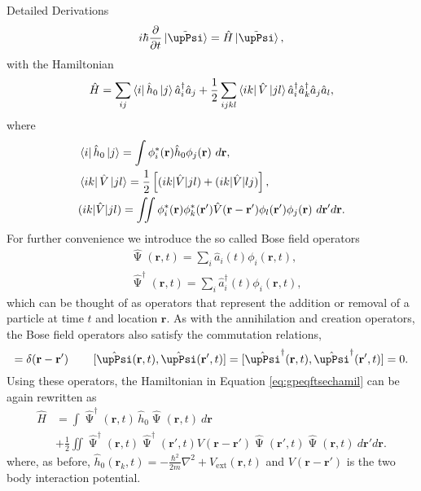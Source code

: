\begin{chapter}{Detailed Derivations\label{app:App2}}
\begin{equation*}
i \hbar\frac{\partial}{\partial t}\ket{\tilde{\upPsi}} = \hat{H}\ket{\tilde{\upPsi}},
\label{eq:gpeqftsecscho}
\end{equation*}
with the Hamiltonian
\begin{equation}
\hat{H} = \sum_{ij}\bra{i}\hat{h}_0\ket{j}\hat{a}_i^\dagger\hat{a}_j + \frac{1}{2}\sum_{ijkl} \bra{ik}\hat{V}\ket{jl}\hat{a}_i^\dagger\hat{a}_k^\dagger\hat{a}_j\hat{a}_l,
\label{eq:gpeqftsechamil}
\end{equation}
where
\begin{align*}
&\bra{i}\hat{h}_0\ket{j} = \int \phi_i^*(\mathbf{r})\hat{h}_0\phi_j(\mathbf{r})~d\mathbf{r},\\
&\bra{ik}\hat{V}\ket{jl} = \frac{1}{2}\left [ (ik|\hat{V}|jl) + (ik|\hat{V}|lj) \right ],\\
&(ik|\hat{V}|jl) = \iint \phi_i^*(\mathbf{r})\phi_k^*(\mathbf{r}')\hat{V}(\mathbf{r}-\mathbf{r}')\phi_l(\mathbf{r}')\phi_j(\mathbf{r})~d\mathbf{r}'d\mathbf{r}.
\end{align*}
For further convenience we introduce the so called Bose field operators
\begin{align*}
&\hat{\upPsi}(\mathbf{r},t) = \sum_i \hat{a}_i(t)\phi_i(\mathbf{r},t),\\
&\hat{\upPsi}^\dagger(\mathbf{r},t) = \sum_i \hat{a}^\dagger_i(t)\phi_i(\mathbf{r},t),
\end{align*}
which can be thought of as operators that represent the addition or removal of a particle at time $t$ and location $\mathbf{r}$. As with the annihilation and creation operators, the Bose field operators also satisfy the commutation relations,
\begin{equation}
[\hat{\upPsi}(\mathbf{r},t),\hat{\upPsi}^\dagger(\mathbf{r}',t)]=\delta(\mathbf{r}-\mathbf{r}')\hspace{0.3in}[\hat{\upPsi}(\mathbf{r},t),\hat{\upPsi}(\mathbf{r}',t)]=[\hat{\upPsi}^\dagger(\mathbf{r},t),\hat{\upPsi}^\dagger(\mathbf{r}',t)]=0.
\label{eq:gpeqftbfocomm}
\end{equation}
Using these operators, the Hamiltonian in Equation \ref{eq:gpeqftsechamil} can be again rewritten as
\begin{equation}
\begin{split}
\hat{H} &= \int \hat{\upPsi}^\dagger(\mathbf{r},t)\,\hat{h}_0 \hat{\upPsi}(\mathbf{r},t)~d\mathbf{r}\\
&+\frac{1}{2}\iint \hat{\upPsi}^\dagger(\mathbf{r},t)\hat{\upPsi}^\dagger(\mathbf{r}',t)V(\mathbf{r}-\mathbf{r}')\hat{\upPsi}(\mathbf{r}',t)\hat{\upPsi}(\mathbf{r},t)~d\mathbf{r}'d\mathbf{r}.
\label{eq:gpeqftbfohamil}
\end{split}
\end{equation}
where, as before, $\hat{h}_0(\mathbf{r}_k,t) = -\frac{\hbar^2}{2m}\nabla^2+V_{\mathrm{ext}}(\mathbf{r},t)$ and $V(\mathbf{r}-\mathbf{r}')$ is the two body interaction potential.


\end{chapter}
